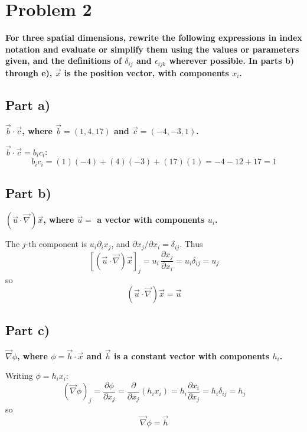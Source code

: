 \documentclass[12pt]{article}
\newcommand{\pd}[2]{\frac{\partial #1}{\partial #2}}
\begin{document}
\newpage

\section*{Problem 2}
\textbf{For three spatial dimensions, rewrite the following expressions in index notation and evaluate or simplify them using the values or parameters given, and the definitions of $\delta_{ij}$ and $\epsilon_{ijk}$ wherever possible. In parts b) through e), $\vec x$ is the position vector, with components $x_i$.}

\subsection*{Part a)}
\textbf{$\vec b \cdot \vec c$, where $\vec b = (1,4,17)$ and $\vec c = (-4,-3,1)$.}

$\vec b \cdot \vec c = b_ic_i$:
\begin{equation}
    b_ic_i = (1)(-4) + (4)(-3) + (17)(1) = -4 - 12 + 17 = \boxed{1}
\end{equation}

\subsection*{Part b)}
\textbf{$\left(\vec u \cdot \vec\nabla\right) \vec x$, where $\vec u = $ a vector with components $u_i$.}

The $j$-th component is $u_i\partial_i x_j$, and $\partial x_j/\partial x_i = \delta_{ij}$. Thus
\begin{equation}
    \left[(\vec u \cdot \vec\nabla)\vec x\right]_j = u_i\,\pd{x_j}{x_i} = u_i\delta_{ij} = u_j
\end{equation}
so
\begin{equation}
    \boxed{(\vec u \cdot \vec\nabla)\vec x = \vec u}
\end{equation}

\subsection*{Part c)}
\textbf{$\vec\nabla \phi$, where $\phi = \vec h \cdot \vec x$ and $\vec h$ is a constant vector with components $h_i$.}

Writing $\phi = h_ix_i$:
\begin{equation}
    (\vec\nabla\phi)_j = \pd{\phi}{x_j} = \pd{}{x_j}(h_ix_i) = h_i\pd{x_i}{x_j} = h_i\delta_{ij} = h_j
\end{equation}
so
\begin{equation}
    \boxed{\vec\nabla\phi = \vec h}
\end{equation}
\end{document}
